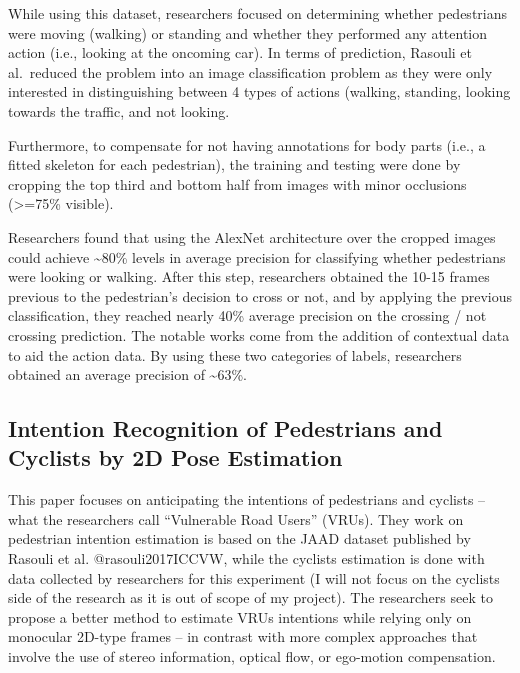 \documentclass[
]{article}
\begin{document}
While using this dataset, researchers focused on determining whether
pedestrians were moving (walking) or standing and whether they performed
any attention action (i.e., looking at the oncoming car). In terms of
prediction, Rasouli et al.~reduced the problem into an image
classification problem as they were only interested in distinguishing
between 4 types of actions (walking, standing, looking towards the
traffic, and not looking.

Furthermore, to compensate for not having annotations for body parts
(i.e., a fitted skeleton for each pedestrian), the training and testing
were done by cropping the top third and bottom half from images with
minor occlusions (\textgreater=75\% visible).

Researchers found that using the AlexNet architecture over the cropped
images could achieve \textasciitilde80\% levels in average precision for
classifying whether pedestrians were looking or walking. After this
step, researchers obtained the 10-15 frames previous to the pedestrian's
decision to cross or not, and by applying the previous classification,
they reached nearly 40\% average precision on the crossing / not
crossing prediction. The notable works come from the addition of
contextual data to aid the action data. By using these two categories of
labels, researchers obtained an average precision of
\textasciitilde63\%.

\hypertarget{intention-recognition-of-pedestrians-and-cyclists-by-2d-pose-estimation}{%
\subsection{Intention Recognition of Pedestrians and Cyclists by 2D Pose
Estimation}\label{intention-recognition-of-pedestrians-and-cyclists-by-2d-pose-estimation}}

This paper focuses on anticipating the intentions of pedestrians and
cyclists -- what the researchers call ``Vulnerable Road Users'' (VRUs).
They work on pedestrian intention estimation is based on the JAAD
dataset published by Rasouli et al. @rasouli2017ICCVW, while the
cyclists estimation is done with data collected by researchers for this
experiment (I will not focus on the cyclists side of the research as it
is out of scope of my project). The researchers seek to propose a better
method to estimate VRUs intentions while relying only on monocular
2D-type frames -- in contrast with more complex approaches that involve
the use of stereo information, optical flow, or ego-motion compensation.
\end{document}

